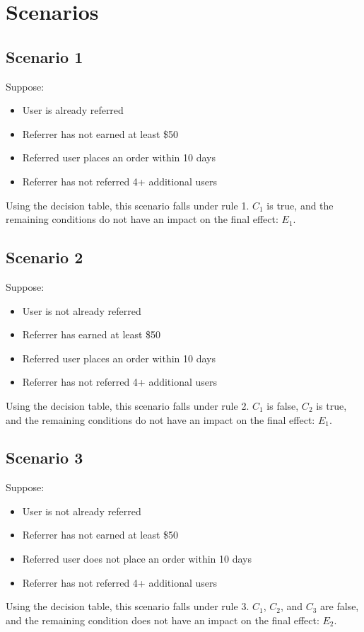 \documentclass[10pt,letterpaper]{article}
\begin{document}
\section{Scenarios}
\subsection{Scenario 1}
Suppose:
\begin{itemize}
	\item{User is already referred}
	\item{Referrer has not earned at least \$50}
	\item{Referred user places an order within 10 days}
	\item{Referrer has not referred 4+ additional users}
\end{itemize}
Using the decision table, this scenario falls under rule 1. $C_1$ is true, and the remaining conditions do not have an impact on the final effect: $E_1$.

\subsection{Scenario 2}
Suppose:
\begin{itemize}
	\item{User is not already referred}
	\item{Referrer has earned at least \$50}
	\item{Referred user places an order within 10 days}
	\item{Referrer has not referred 4+ additional users}
\end{itemize}
Using the decision table, this scenario falls under rule 2. $C_1$ is false, $C_2$ is true, and the remaining conditions do not have an impact on the final effect: $E_1$.

\subsection{Scenario 3}
Suppose:
\begin{itemize}
	\item{User is not already referred}
	\item{Referrer has not earned at least \$50}
	\item{Referred user does not place an order within 10 days}
	\item{Referrer has not referred 4+ additional users}
\end{itemize}
Using the decision table, this scenario falls under rule 3. $C_1$, $C_2$, and $C_3$ are false, and the remaining condition does not have an impact on the final effect: $E_2$.
\end{document}
